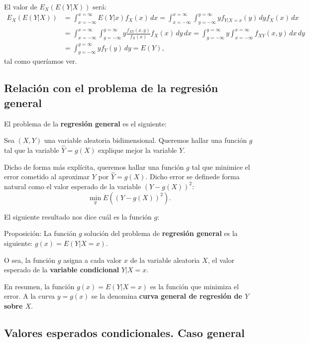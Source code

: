 \documentclass[]{book}
\begin{document}
El valor de \(E_X(E(Y|X))\) será:
\[
\begin{array}{rl}
E_X(E(Y|X)) & =\int_{x=-\infty}^{x=\infty} E(Y|x)f_X(x)\, dx=\int_{x=-\infty}^{x=\infty}\int_{y=-\infty}^{y=\infty} y f_{Y|X=x}(y)\, dy f_X(x)\, dx \\ & = \int_{x=-\infty}^{x=\infty}\int_{y=-\infty}^{y=\infty} y \frac{f_{XY}(x,y)}{f_X(x)}f_X(x)\, dy\, dx = \int_{y=-\infty}^{y=\infty} y \int_{x=-\infty}^{x=\infty}f_{XY}(x,y)\, dx\, dy \\ &  = \int_{y=-\infty}^{y=\infty} y f_Y(y)\, dy = E(Y),
\end{array}
\]
tal como queríamos ver.

\hypertarget{relaciuxf3n-con-el-problema-de-la-regresiuxf3n-general}{%
\subsection{Relación con el problema de la regresión general}\label{relaciuxf3n-con-el-problema-de-la-regresiuxf3n-general}}

El problema de la \textbf{regresión general} es el siguiente:

Sea \((X,Y)\) una variable aleatoria bidimensional. Queremos hallar una función \(g\) tal que la variable \(\hat{Y}=g(X)\) explique mejor la variable \(Y\).

Dicho de forma más explícita, queremos hallar una función \(g\) tal que minimice el error cometido al aproximar \(Y\) por \(\hat{Y}=g(X)\). Dicho error se definede forma natural como el valor esperado de la variable \((Y-g(X))^2\):
\[
\min_g E\left((Y-g(X))^2\right).
\]

El siguiente resultado nos dice cuál es la función \(g\):

Proposición:
La función \(g\) solución del problema de \textbf{regresión general} es la siguiente: \(g(x)=E(Y|X=x)\).

O sea, la función \(g\) asigna a cada valor \(x\) de la variable aleatoria \(X\), el valor esperado de la \textbf{variable condicional} \(Y|X=x\).

En resumen, la función \(g(x)=E(Y|X=x)\) es la función que minimiza el error. A la curva \(y=g(x)\) se la denomina \textbf{curva general de regresión de \(Y\) sobre \(X\)}.

\hypertarget{valores-esperados-condicionales.-caso-general}{%
\subsection{Valores esperados condicionales. Caso general}\label{valores-esperados-condicionales.-caso-general}}
\end{document}
